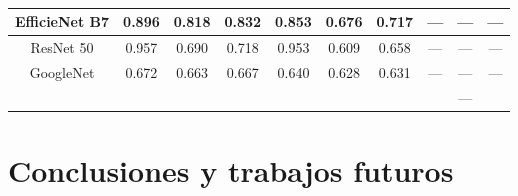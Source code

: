 \documentclass[a4paper,12pt,twoside,titlepage]{article}
\begin{document}
\begin{table}[h!]
\begin{tabular}{cccccccccc}
  \multicolumn{1}{|c|}{EfficieNet B7}          & \multicolumn{1}{c|}{0.896} & \multicolumn{1}{c|}{0.818} & \multicolumn{1}{c|}{0.832}      & \multicolumn{1}{c|}{0.853} & \multicolumn{1}{c|}{0.676} & \multicolumn{1}{c|}{0.717}      & \multicolumn{1}{c|}{---}   & \multicolumn{1}{c|}{---}   & \multicolumn{1}{c|}{---}        \\ \hline
  \multicolumn{1}{|c|}{ResNet 50}              & \multicolumn{1}{c|}{0.957} & \multicolumn{1}{c|}{0.690} & \multicolumn{1}{c|}{0.718}      & \multicolumn{1}{c|}{0.953} & \multicolumn{1}{c|}{0.609} & \multicolumn{1}{c|}{0.658}      & \multicolumn{1}{c|}{---}   & \multicolumn{1}{c|}{---}   & \multicolumn{1}{c|}{---}        \\ \hline
  \multicolumn{1}{|c|}{GoogleNet}              & \multicolumn{1}{c|}{0.672} & \multicolumn{1}{c|}{0.663} & \multicolumn{1}{c|}{0.667}      & \multicolumn{1}{c|}{0.640} & \multicolumn{1}{c|}{0.628} & \multicolumn{1}{c|}{0.631}      & \multicolumn{1}{c|}{---}   & \multicolumn{1}{c|}{---}   & \multicolumn{1}{c|}{---}        \\ \hline
  \multicolumn{1}{l}{}                         & \multicolumn{1}{l}{}       & \multicolumn{1}{l}{}       & \multicolumn{1}{l}{}            & \multicolumn{1}{l}{}       & \multicolumn{1}{l}{}       & \multicolumn{1}{l}{}            & \multicolumn{1}{l}{}       & ---                        & \multicolumn{1}{l}{}           
  \end{tabular}
  \caption{}
  \label{tab:my-table}
  \end{table}
\section{Conclusiones y trabajos futuros}


\newpage

\printbibliography[title={Bibliografía}]
\end{document}
